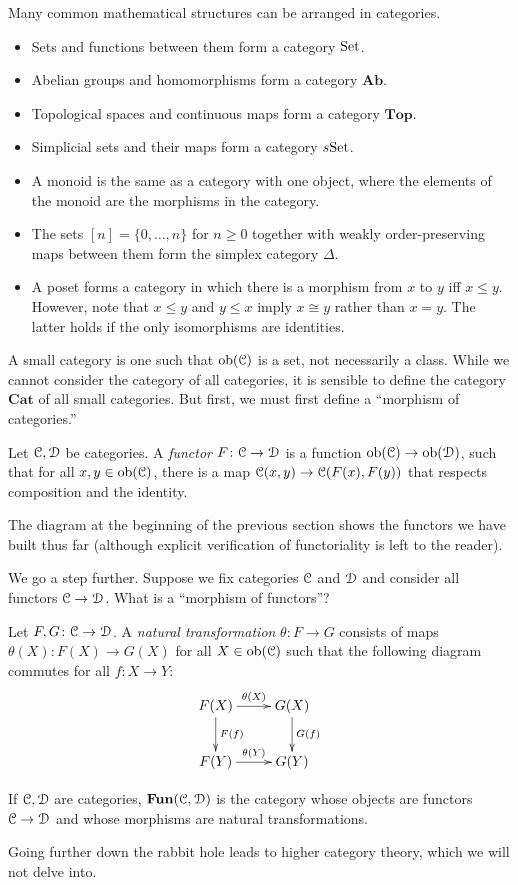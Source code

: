 \begin{example}
Many common mathematical structures can be arranged in categories.
\begin{itemize}
\item Sets and functions between them form a category ${\mathrm{Set}}$.
\item Abelian groups and homomorphisms form a category $\mathbf{Ab}$.
\item Topological spaces and continuous maps form a category $\mathbf{Top}$.
\item Simplicial sets and their maps form a category $s{\mathrm{Set}}$.
\item A monoid is the same as a category with one object, where the elements of the monoid are the morphisms in the category.
\item The sets $[n]=\{0,\ldots,n\}$ for $n\geq 0$ together with weakly order-preserving maps between them form the simplex category $\Delta$.
\item A poset forms a category in which there is a morphism from $x$ to $y$ iff $x\leq y$. However, note that $x\leq y$ and $y\leq x$ imply $x\cong y$ rather than $x=y$. The latter holds if the only isomorphisms are identities.
\end{itemize}
\end{example}
A small category is one such that $\mathrm{ob}(\mathcal C)$ is a set, not necessarily a class. While we cannot consider the category of all categories, it is sensible to define the category $\mathbf{Cat}$ of all small categories. But first, we must first define a ``morphism of categories.''
\begin{definition}
Let $\mathcal C,\mathcal D$ be categories. A \emph{functor} $F\colon\mathcal C\to\mathcal D$ is a function $\mathrm{ob}(\mathcal C)\to\mathrm{ob}(\mathcal D)$, such that for all $x,y\in\mathrm{ob}(\mathcal C)$, there is a map $\mathcal C(x,y)\to\mathcal C(F(x),F(y))$ that respects composition and the identity.
\end{definition}
The diagram at the beginning of the previous section shows the functors we have built thus far (although explicit verification of functoriality is left to the reader).

We go a step further. Suppose we fix categories $\mathcal C$ and $\mathcal D$ and consider all functors $\mathcal C\to\mathcal D$. What is a ``morphism of functors''?
\begin{definition}
Let $F,G\colon \mathcal C\to\mathcal D$. A \emph{natural transformation} $\theta\colon F\to G$ consists of maps $\theta(X)\colon F(X)\to G(X)$ for all $X\in\mathrm{ob}(\mathcal C)$ such that the following diagram commutes for all $f\colon X\to Y$:
\begin{equation*}
\xymatrix{F(X)\ar[d]^{F(f)}\ar[r]^{\theta(X)} & G(X)\ar[d]^{G(f)}\\
F(Y)\ar[r]^{\theta(Y)} & G(Y)}
\end{equation*}
\end{definition}
\begin{definition}
If $\mathcal C,\mathcal D$ are categories, $\mathbf{Fun}(\mathcal C,\mathcal D)$ is the category whose objects are functors $\mathcal C\to\mathcal D$ and whose morphisms are natural transformations.
\end{definition}
Going further down the rabbit hole leads to higher category theory, which we will not delve into.

